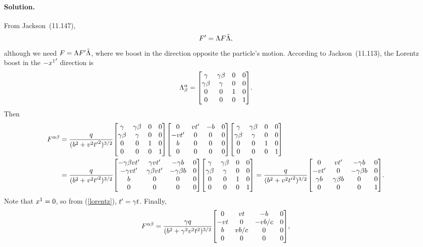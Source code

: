\documentclass[11pt]{article}
\newcommand{\refeq}[1]{(\ref{#1})}
\newcommand{\beq}{\begin{equation*}}
\newcommand{\eeq}{\end{equation*}}
\newcommand{\beqn}{\begin{equation}}
\newcommand{\eeqn}{\end{equation}}
\newenvironment{solution}
{
	\paragraph{Solution.}
	\ignorespaces
}
{
    \bigskip
}
\begin{document}
\begin{solution}
	From Jackson~(11.147),
	\beq
		F' = \Lam F \tLam,
	\eeq
	although we need $F = \Lambda F' \tilde{\Lambda}$, where we boost in the direction opposite the particle's motion.  According to Jackson~(11.113), the Lorentz boost in the $-{x^1}'$ direction is
	\beq
		\Lam^\alp_\bet = \mqty[ 	\gam & \gam \beta & 0 & 0 \\	
							\gam \beta & \gam & 0 & 0 \\
							0 & 0 & 1 & 0 \\
							0 & 0 & 0 & 1 ].
	\eeq
	Then
	\begin{align*}
		\Fab &= \frac{q}{(b^2 + v^2 {t'}^2)^{3/2}}
			\mqty[ \gam & \gam \beta & 0 & 0 \\	
				\gam \beta & \gam & 0 & 0 \\
				0 & 0 & 1 & 0 \\
				0 & 0 & 0 & 1 ]
			\mqty[ 0 & v t' & -b & 0 \\
				-v t' & 0 & 0 & 0 \\
				b & 0 & 0 & 0 \\
				0 & 0 & 0 & 0 ]
			\mqty[ \gam & \gam \beta & 0 & 0 \\	
				\gam \beta & \gam & 0 & 0 \\
				0 & 0 & 1 & 0 \\
				0 & 0 & 0 & 1 ] \\
		&= \frac{q}{(b^2 + v^2 {t'}^2)^{3/2}}
			\mqty[ -\gam \bet v t' & \gam v t' & -\gam b & 0 \\
				-\gam v t' & \gam \bet v t' & -\gam \bet b & 0 \\
				b & 0 & 0 & 0 \\
				0 & 0 & 0 & 0 ]
			\mqty[ \gam & \gam \beta & 0 & 0 \\	
				\gam \beta & \gam & 0 & 0 \\
				0 & 0 & 1 & 0 \\
				0 & 0 & 0 & 1 ]
		= \frac{q}{(b^2 + v^2 {t'}^2)^{3/2}}
			\mqty[ 0 & v t' & -\gam b & 0 \\
				-v t' & 0 & -\gam \bet b & 0 \\
				\gam b & \gam \bet b & 0 & 0 \\
				0 & 0 & 0 & 1 ].
	\end{align*}
	Note that $x^1 = 0$, so from \refeq{lorentz}, $t' = \gamma t$.  Finally,
	\beqn \label{thing2.1}
		\Fab = \frac{\gam q}{(b^2 + \gam^2 v^2 t^2)^{3/2}} 
			\mqty[0 & v t & -b & 0 \\
				-v t & 0 & -v b / c & 0 \\
				b & v b / c & 0 & 0 \\
				0 & 0 & 0 & 0 ],
	\eeqn
	

\end{solution}
\end{document}
